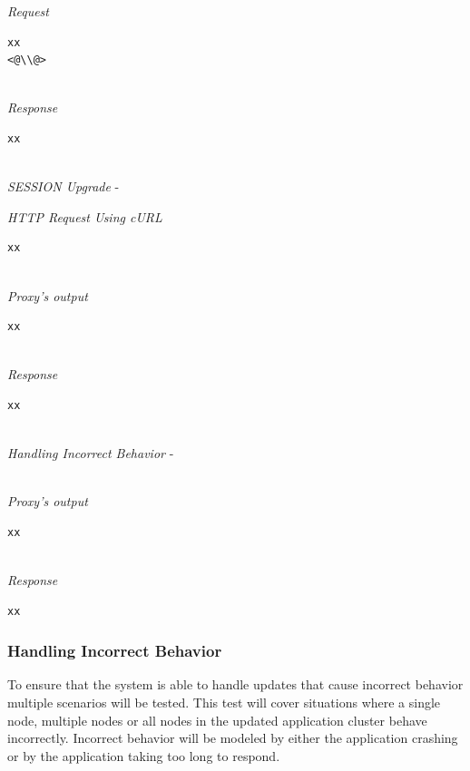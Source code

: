 \documentclass[a4paper,11pt,twoside]{article}
\begin{document}
\noindent
\textit{Request}
\begin{lstlisting}[language=terminal]
xx
<@\\@>
\end{lstlisting}

\noindent\\
\textit{Response}
\begin{lstlisting}[language=terminal]
xx
\end{lstlisting}  

\noindent\\
\textit{SESSION Upgrade} - 

\noindent
\textit{HTTP Request Using cURL}
\begin{lstlisting}[language=terminal]
xx
\end{lstlisting}

\noindent\\
\textit{Proxy's output}
\begin{lstlisting}[language=terminal]
xx
\end{lstlisting}

\noindent\\
\textit{Response}
\begin{lstlisting}[language=terminal]
xx

\end{lstlisting}

\noindent\\
\textit{Handling Incorrect Behavior} - \smallskip 

\noindent\\
\textit{Proxy's output}
\begin{lstlisting}[language=terminal]
xx
\end{lstlisting}







\noindent\\
\textit{Response}
\begin{lstlisting}[language=terminal]
xx
\end{lstlisting}
   
   

   


















\subsubsection{Handling Incorrect Behavior} 
To ensure that the system is able to handle updates that cause incorrect behavior multiple scenarios will be tested. This test will cover situations where a single node, multiple nodes or all nodes in the updated application cluster behave incorrectly. Incorrect behavior will be modeled by either the application crashing or by the application taking too long to respond.
\clearpage
\end{document}
